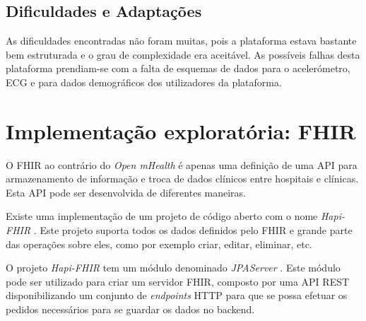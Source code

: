 \subsection{Dificuldades e Adaptações}

As dificuldades encontradas não foram muitas, pois a plataforma estava bastante bem estruturada e o grau de complexidade era aceitável. As possíveis falhas desta plataforma prendiam-se com a falta de esquemas de dados para o acelerómetro, \gls{ECG} e para dados demográficos dos utilizadores da plataforma.

\section{Implementação exploratória: FHIR}
O \gls{FHIR} ao contrário do \textit{Open mHealth} é apenas uma definição de uma \gls{API} para armazenamento de informação e troca de dados clínicos entre hospitais e clínicas. Esta \gls{API} pode ser desenvolvida de diferentes maneiras. \par 
Existe uma implementação de um projeto de código aberto com o nome \textit{Hapi-FHIR} \cite{hapi-index}. Este projeto suporta todos os dados definidos pelo \gls{FHIR} e grande parte das operações sobre eles, como por exemplo criar, editar, eliminar, etc.
\par 
O projeto \textit{Hapi-FHIR} tem um módulo denominado \textit{JPAServer}  \cite{jpa-server}. Este módulo pode ser utilizado para criar um servidor \gls{FHIR}, composto por uma \gls{API} \gls{REST} disponibilizando um conjunto de \textit{endpoints} \gls{HTTP} para que se possa efetuar os pedidos necessários para se guardar os dados no backend. \par

